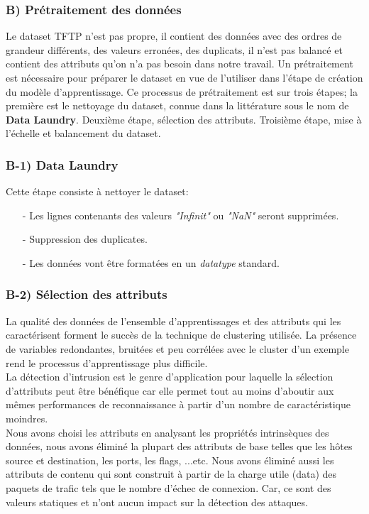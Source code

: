 \subsubsection{B) Prétraitement des données }
Le dataset TFTP n'est pas propre, il contient des données avec des ordres de grandeur différents, des valeurs erronées, des duplicats, il n'est pas balancé et contient des attributs qu'on n'a pas besoin dans notre travail. Un prétraitement est nécessaire pour préparer le dataset en vue de l'utiliser dans l'étape de création du modèle d'apprentissage. Ce processus de prétraitement est sur trois étapes; la première est le nettoyage du dataset, connue dans la littérature sous le nom de \textbf{Data Laundry}. Deuxième étape, sélection des attributs. Troisième étape, mise à l'échelle et balancement du dataset.

\subsubsection{B-1) Data Laundry}
Cette étape consiste à nettoyer le dataset:\\
\begin{itemize}
\item[-] Les lignes contenants des valeurs \textit{"Infinit"} ou \textit{"NaN"} seront supprimées.
\item[-] Suppression des duplicates.
\item[-] Les données vont être formatées en un \textit{datatype} standard.
\end{itemize}

\subsubsection{B-2) Sélection des attributs}
\label{attributs}
La qualité des données de l’ensemble d’apprentissages et des attributs qui les caractérisent forment le succès de la technique de clustering utilisée. La présence de variables redondantes, bruitées et peu corrélées avec le cluster d’un exemple rend le processus d’apprentissage plus difficile.\\

\noindent La détection d’intrusion est le genre d’application pour laquelle la sélection d’attributs peut être bénéfique car elle permet tout au moins d’aboutir aux mêmes performances de reconnaissance à partir d’un nombre de caractéristique moindres.\\

\noindent Nous avons choisi les attributs en analysant les propriétés intrinsèques des données, nous avons éliminé la plupart des attributs de base telles que  les hôtes source et destination, les ports, les flags, ...etc. Nous avons éliminé aussi les attributs de contenu qui sont construit à partir de la charge utile (data) des paquets de trafic tels que le nombre d’échec de connexion.  Car, ce sont des valeurs statiques et n’ont aucun impact sur la détection des attaques.\\

